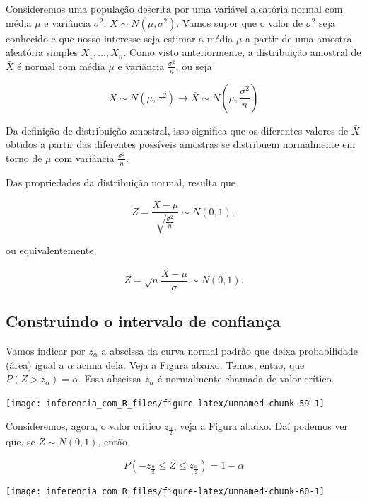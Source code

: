 \documentclass[
]{book}
\begin{document}
Consideremos uma população descrita por uma variável aleatória normal com média \(\mu\) e variância \(\sigma^2\): \(X\sim N(\mu,\sigma^2)\). Vamos supor que o valor de \(\sigma^2\) seja conhecido e que nosso interesse seja estimar a média \(\mu\) a partir de uma amostra aleatória simples \(X_1,\ldots,X_n\). Como visto anteriormente, a distribuição amostral de \(\bar X\) é normal com média \(\mu\) e variância \(\frac{\sigma^2}{n}\), ou seja

\[X\sim N(\mu,\sigma^2)\rightarrow \bar X \sim N\left(\mu,\frac{\sigma^2}{n}\right)\]

Da definição de distribuição amostral, isso significa que os diferentes valores de \(\bar X\) obtidos a partir das diferentes possíveis amostras se distribuem normalmente em torno de \(\mu\) com variância \(\frac{\sigma^2}{n}\).

Das propriedades da distribuição normal, resulta que

\[Z=\frac{\bar X-\mu}{\sqrt{\frac{\sigma^2}{n}}}\sim N(0,1),\]

ou equivalentemente,

\[Z=\sqrt{n}\frac{\bar X-\mu}{\sigma}\sim N(0,1).\]

\hypertarget{construindo-o-intervalo-de-confianuxe7a}{%
\subsection{Construindo o intervalo de confiança}\label{construindo-o-intervalo-de-confianuxe7a}}

Vamos indicar por \(z_\alpha\) a abscissa da curva normal padrão que deixa probabilidade (área) igual a \(\alpha\) acima dela. Veja a Figura abaixo. Temos, então, que \(P(Z > z_\alpha)= \alpha\). Essa abscissa \(z_\alpha\) é normalmente chamada de valor crítico.

\begin{center}\texttt{[image: inferencia\_com\_R\_files/figure-latex/unnamed-chunk-59-1]} \end{center}

Consideremos, agora, o valor crítico \(z_\frac{\alpha}{2}\), veja a Figura abaixo. Daí podemos ver que, se \(Z\sim N(0,1)\), então

\[P\left(-z_\frac{\alpha}{2}\leq Z \leq z_\frac{\alpha}{2}\right)=1-\alpha\]

\begin{center}\texttt{[image: inferencia\_com\_R\_files/figure-latex/unnamed-chunk-60-1]} \end{center}
\end{document}
